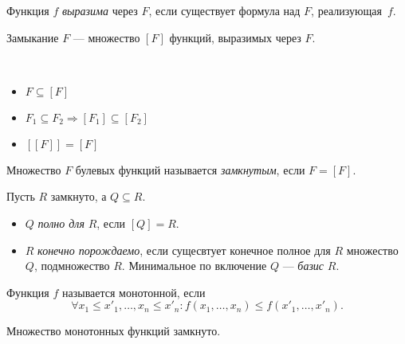 \documentclass[12pt,a4paper]{article}
\begin{document}
    \begin{definition}
        Функция $f$ \emph{выразима} через $F$, если существует формула над $F$, реализующая~$f$.
    \end{definition}

    \begin{definition}
        Замыкание $F$ --- множество $[F]$ функций, выразимых через $F$. 
    \end{definition}

    \begin{statement}\ 
        \begin{itemize}
            \item $F \subseteq [F]$
            \item $F_1 \subseteq F_2 \Rightarrow [F_1] \subseteq [F_2]$
            \item $[[F]] = [F]$
        \end{itemize}
    \end{statement}

    \begin{definition}
        Множество $F$ булевых функций называется \emph{замкнутым}, если $F = [F]$.
    \end{definition}

    \begin{definition}
        Пусть $R$ замкнуто, а $Q\subseteq R$.
        \begin{itemize}
            \item $Q$ \emph{полно для} $R$, если $[Q] = R$.
            \item $R$ \emph{конечно порождаемо}, если сущесвтует конечное полное для $R$ множество $Q$, подмножество $R$. Минимальное по включение $Q$ --- \emph{базис} $R$.
        \end{itemize}
    \end{definition}

    \begin{definition}
        Функция $f$ называется монотонной, если \[\forall x_1 \leqslant x'_1, \dots, x_n \leqslant x'_n : f(x_1, \dots, x_n) \leqslant f(x'_1, \dots, x'_n).\]
    \end{definition}

    \begin{statement}
        Множество монотонных функций замкнуто.
    \end{statement}
\end{document}
